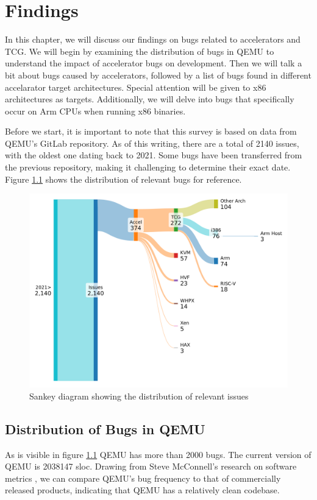 
\chapter{Findings}\label{chapter:findings}
In this chapter, we will discuss our findings on bugs related to accelerators and \ac{TCG}.
We will begin by examining the distribution of bugs in \ac{QEMU} to understand the impact of accelerator bugs on development.
Then we will talk a bit about bugs caused by accelerators, followed by a list of bugs found in different accelarator target architectures.
Special attention will be given to x86 architectures as targets.
Additionally, we will delve into bugs that specifically occur on Arm CPUs when running x86 binaries.

Before we start, it is important to note that this survey is based on data from QEMU's GitLab repository.
As of this writing, there are a total of 2140 issues, with the oldest one dating back to 2021.
Some bugs have been transferred from the previous repository, making it challenging to determine their exact date.
Figure \ref{fig:issues} shows the distribution of relevant bugs for reference.

\begin{figure}[ht]
    \centering
    \includegraphics[width=0.8\linewidth]{figures/issues3}
    \caption[QEMU bug distribution]{Sankey diagram showing the distribution of relevant issues}
    \label{fig:issues}
\end{figure}

\section{Distribution of Bugs in QEMU}
As is visible in figure \ref{fig:issues} \ac{QEMU} has more than 2000 bugs.
The current version of \ac{QEMU} is 2038147 \ac{sloc}.
Drawing from Steve McConnell's research on software metrics \cite{sloc}, we can compare QEMU's bug frequency to that of commercially released products, indicating that QEMU has a relatively clean codebase.

